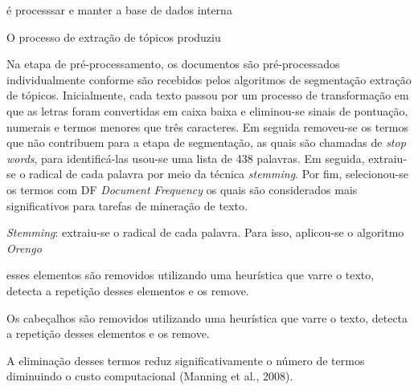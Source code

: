  é processsar e manter a base de dados interna











O processo de extração de tópicos produziu 












Na etapa de pré-processamento, os documentos são pré-processados individualmente conforme são recebidos pelos algoritmos de segmentação extração de tópicos. 
Inicialmente, cada texto passou por um processo de transformação em que as letras foram convertidas em caixa baixa e eliminou-se sinais de pontuação, numerais e termos menores que três caracteres. Em seguida removeu-se os termos que não contribuem para a etapa de segmentação, as quais são chamadas de \textit{stop words}, para identificá-las usou-se uma lista de 438 palavras. Em seguida, extraiu-se o radical de cada palavra por meio da técnica \textit{stemming}. Por fim, selecionou-se os termos com DF \textit{Document Frequency}  os quais são considerados mais significativos para tarefas de mineração de texto.



\textit{Stemming}: extraiu-se o radical de cada palavra. Para isso, aplicou-se o algoritmo \textit{Orengo} %













esses elementos são removidos utilizando uma heurística que varre o texto, detecta a repetição desses elementos e os remove.


Os cabeçalhos são removidos utilizando uma heurística que varre o texto, detecta a repetição desses elementos e os remove.

A eliminação desses termos reduz significativamente o número de termos diminuindo o custo computacional (Manning et al., 2008).






